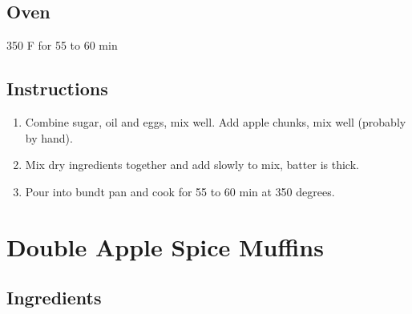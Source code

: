\documentclass[letterpaper,10pt,english]{sphinxmanual}
\begin{document}
\section{Oven}
\label{\detokenize{Apple_Cake:oven}}
350 F for 55 to 60 min


\section{Instructions}
\label{\detokenize{Apple_Cake:instructions}}\begin{enumerate}
\item {} 
Combine sugar, oil and eggs, mix well. Add apple chunks, mix well (probably by hand).

\item {} 
Mix dry ingredients together and add slowly to mix, batter is thick.

\item {} 
Pour into bundt pan and cook for 55 to 60 min at 350 degrees.

\end{enumerate}


\chapter{Double Apple Spice Muffins}
\label{\detokenize{Double_ASM:double-apple-spice-muffins}}\label{\detokenize{Double_ASM::doc}}\begin{quote}

\end{quote}


\section{Ingredients}
\label{\detokenize{Double_ASM:ingredients}}
%
\begin{sphinxVerbatim}[commandchars=\\\{\}]
  
  
  
  
  
 
  
   
  
  
   
   
     
\end{sphinxVerbatim}
\end{document}
